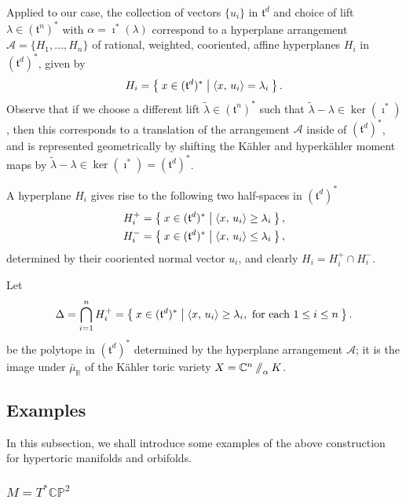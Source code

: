 \documentclass{amsart}
\newcommand{\PP}{\mathbb{P}}
\newcommand{\RR}{\mathbb{R}}
\newcommand{\CC}{\mathbb{C}}
\newcommand{\mcA}{\mathcal{A}}
\newcommand{\mft}{\mathfrak{t}}
\newcommand{\sslash}{\mathbin{/\mkern-6mu/}}
\begin{document}
	Applied to our case, the collection of vectors $\{u_{i}\}$ in $\mft^{d}$ and choice of lift $\lambda \in (\mft^{n})^{\ast}$ with $\alpha = \imath^{\ast}(\lambda)$ correspond to a hyperplane arrangement $\mcA = \{H_{1}, \ldots, H_{n}\}$ of rational, weighted, cooriented, affine hyperplanes $H_{i}$ in $(\mft^{d})^{\ast}$, given by
	\[
		H_{i} = \Set{ x \in (\mft^{d})^{\ast} | \langle x,\, u_{i} \rangle = \lambda_{i}}.
	\]
	Observe that if we choose a different lift $\tilde{\lambda} \in (\mft^{n})^{\ast}$ such that $\tilde{\lambda} -\lambda \in \ker(\imath^{\ast})$, then this corresponds to a translation of the arrangement $\mcA$ inside of $(\mft^{d})^{\ast}$, and is represented geometrically by shifting the K\"ahler and hyperk\"ahler moment maps by $\tilde{\lambda} - \lambda \in \ker(\imath^{\ast}) = (\mft^{d})^{\ast}$. 
	
	A hyperplane $H_{i}$ gives rise to the following two half-spaces in $(\mft^{d})^{\ast}$
	\begin{align*}
		H_{i}^{+} &= \Set{ x \in (\mft^{d})^{\ast} | \langle x,\, u_{i} \rangle \geq \lambda_{i} }, \\
		H_{i}^{-} &= \Set{ x \in (\mft^{d})^{\ast} | \langle x,\, u_{i} \rangle \leq \lambda_{i} },
	\end{align*}
	determined by their cooriented normal vector $u_{i}$, and clearly $H_{i} = H_{i}^{+} \cap H_{i}^{-}$.
	
	Let
	\[
		\Delta = \bigcap_{i=1}^{n} H_{i}^{+} = \Set{x \in (\mft^{d})^{\ast} | \langle x,\, u_{i} \rangle \geq \lambda_{i}, \text{ for each } 1 \leq i \leq n }.
	\]
	be the polytope in $(\mft^{d})^{\ast}$ determined by the hyperplane arrangement $\mcA$; it is the image under $\bar{\mu}_{\RR}$ of the K\"ahler toric variety $X = \CC^{n}\sslash_{\alpha} K$.
	
	\subsection{Examples}
	
	In this subsection, we shall introduce some examples of the above construction for hypertoric manifolds and orbifolds.
	
	\subsubsection{$M = T^{\ast}\CC\PP^{2}$}
	
\end{document}
